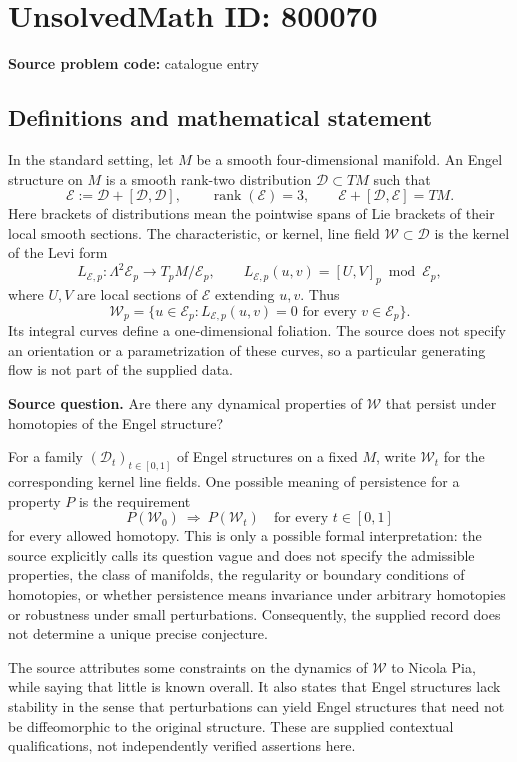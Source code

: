 \documentclass[11pt]{article}
\begin{document}
\section*{UnsolvedMath ID: 800070}
\textbf{Source problem code:} catalogue entry
\subsection{Definitions and mathematical statement}
In the standard setting, let \(M\) be a smooth four-dimensional manifold. An Engel structure on \(M\) is a smooth rank-two distribution \(\mathcal D\subset TM\) such that
\[
\mathcal E:=\mathcal D+[\mathcal D,\mathcal D],\qquad
\operatorname{rank}(\mathcal E)=3,\qquad
\mathcal E+[\mathcal D,\mathcal E]=TM.
\]
Here brackets of distributions mean the pointwise spans of Lie brackets of their local smooth sections. The characteristic, or kernel, line field \(\mathcal W\subset\mathcal D\) is the kernel of the Levi form
\[
L_{\mathcal E,p}\colon\Lambda^2\mathcal E_p\longrightarrow T_pM/\mathcal E_p,
\qquad
L_{\mathcal E,p}(u,v)=[U,V]_p\bmod\mathcal E_p,
\]
where \(U,V\) are local sections of \(\mathcal E\) extending \(u,v\). Thus
\[
\mathcal W_p=\{u\in\mathcal E_p:L_{\mathcal E,p}(u,v)=0\text{ for every }v\in\mathcal E_p\}.
\]
Its integral curves define a one-dimensional foliation. The source does not specify an orientation or a parametrization of these curves, so a particular generating flow is not part of the supplied data.

\textbf{Source question.} Are there any dynamical properties of \(\mathcal W\) that persist under homotopies of the Engel structure?

For a family \((\mathcal D_t)_{t\in[0,1]}\) of Engel structures on a fixed \(M\), write \(\mathcal W_t\) for the corresponding kernel line fields. One possible meaning of persistence for a property \(P\) is the requirement
\[
P(\mathcal W_0)\ \Longrightarrow\ P(\mathcal W_t)
\quad\text{for every }t\in[0,1]
\]
for every allowed homotopy. This is only a possible formal interpretation: the source explicitly calls its question vague and does not specify the admissible properties, the class of manifolds, the regularity or boundary conditions of homotopies, or whether persistence means invariance under arbitrary homotopies or robustness under small perturbations. Consequently, the supplied record does not determine a unique precise conjecture.

The source attributes some constraints on the dynamics of \(\mathcal W\) to Nicola Pia, while saying that little is known overall. It also states that Engel structures lack stability in the sense that perturbations can yield Engel structures that need not be diffeomorphic to the original structure. These are supplied contextual qualifications, not independently verified assertions here.
\end{document}

